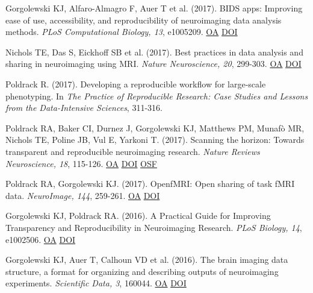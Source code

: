 \documentclass[10pt, letterpaper]{article}
\begin{document}
Gorgolewski KJ, Alfaro-Almagro F, Auer T et al. (2017). BIDS apps: Improving ease of use, accessibility, and reproducibility of neuroimaging data analysis methods. \textit{PLoS Computational Biology, 13}, e1005209. \href{https://www.ncbi.nlm.nih.gov/pmc/articles/PMC5363996}{OA} \href{https://doi.org/10.1371/journal.pcbi.1005209}{DOI} \vspace{2mm}

Nichols TE, Das S, Eickhoff SB et al. (2017). Best practices in data analysis and sharing in neuroimaging using MRI. \textit{Nature Neuroscience, 20}, 299-303. \href{https://www.ncbi.nlm.nih.gov/pmc/articles/PMC5685169}{OA} \href{https://doi.org/10.1038/nn.4500}{DOI} \vspace{2mm}

Poldrack R.  (2017). Developing a reproducible workflow for large-scale phenotyping. In \textit{The Practice of Reproducible Research: Case Studies and Lessons from the Data-Intensive Sciences}, 311-316. \vspace{2mm}

Poldrack RA, Baker CI, Durnez J, Gorgolewski KJ, Matthews PM, Munafò MR, Nichols TE, Poline JB, Vul E, Yarkoni T.  (2017). Scanning the horizon: Towards transparent and reproducible neuroimaging research. \textit{Nature Reviews Neuroscience, 18}, 115-126. \href{https://www.ncbi.nlm.nih.gov/pmc/articles/PMC6910649}{OA} \href{https://doi.org/10.1038/nrn.2016.167}{DOI} \href{https://osf.io/spr9a/}{OSF} \vspace{2mm}

Poldrack RA, Gorgolewski KJ.  (2017). OpenfMRI: Open sharing of task fMRI data. \textit{NeuroImage, 144}, 259-261. \href{https://www.ncbi.nlm.nih.gov/pmc/articles/PMC4669234}{OA} \href{https://doi.org/10.1016/j.neuroimage.2015.05.073}{DOI} \vspace{2mm}

Gorgolewski KJ, Poldrack RA.  (2016). A Practical Guide for Improving Transparency and Reproducibility in Neuroimaging Research. \textit{PLoS Biology, 14}, e1002506. \href{https://www.ncbi.nlm.nih.gov/pmc/articles/PMC4936733}{OA} \href{https://doi.org/10.1371/journal.pbio.1002506}{DOI} \vspace{2mm}

Gorgolewski KJ, Auer T, Calhoun VD et al. (2016). The brain imaging data structure, a format for organizing and describing outputs of neuroimaging experiments. \textit{Scientific Data, 3}, 160044. \href{https://www.ncbi.nlm.nih.gov/pmc/articles/PMC4978148}{OA} \href{https://doi.org/10.1038/sdata.2016.44}{DOI} \vspace{2mm}
\end{document}
